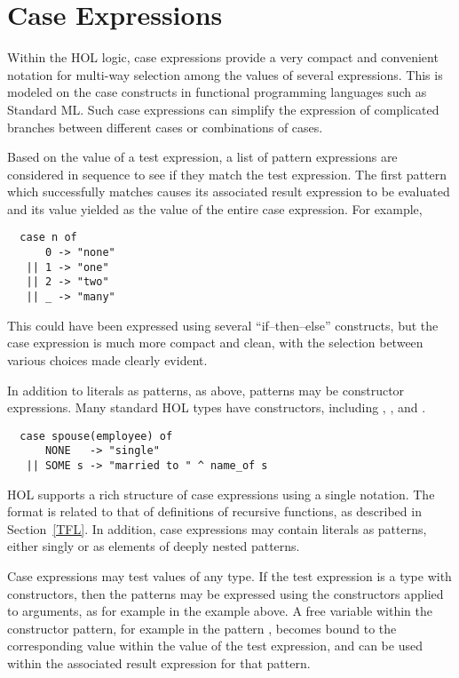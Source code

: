 \section{Case Expressions}\label{CaseExp}

Within the HOL{} logic,
case expressions provide a very compact and convenient notation
for multi-way selection among the values of several expressions.
This is modeled on the case constructs in functional programming
languages such as Standard ML.  Such case expressions can simplify
the expression of complicated branches between different cases or
combinations of cases.

Based on the value of a test expression, a list of pattern expressions
are considered in sequence to see if they match the test expression.
The first pattern which successfully matches causes its associated result
expression to be evaluated and its value yielded as the value of the
entire case expression.  For example,
%
\begin{hol}
\begin{verbatim}
  case n of
      0 -> "none"
   || 1 -> "one"
   || 2 -> "two"
   || _ -> "many"
\end{verbatim}
\end{hol}
%

This could have been expressed using several ``if--then--else'' constructs,
but the case expression is much more compact and clean, with the
selection between various choices made clearly evident.

In addition to literals as patterns, as above, patterns may be
constructor expressions.  Many standard HOL{} types have constructors,
including , , and .
%
\begin{hol}
\begin{verbatim}
  case spouse(employee) of
      NONE   -> "single"
   || SOME s -> "married to " ^ name_of s
\end{verbatim}
\end{hol}
%

HOL{} supports a rich structure of case expressions using a single
notation.  The format is related to that of definitions of recursive
functions, as described in Section~\ref{TFL}.  In addition, case
expressions may contain literals as patterns, either singly or as
elements of deeply nested patterns.

Case expressions may test values of any type.  If the test expression
is a type with constructors, then the patterns may be expressed
using the constructors applied to arguments, as for example 
in the example above.  A free variable within the constructor pattern,
for example  in the pattern , becomes bound to the
corresponding value within the value of the test expression, and
can be used within the associated result expression for that pattern.

